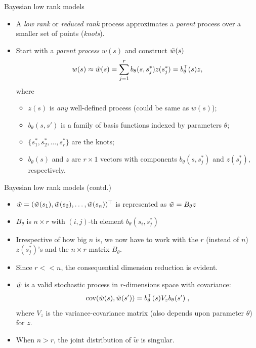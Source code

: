 \begin{frame}{Bayesian low rank models}

\begin{itemize}\setlength{\itemsep}{0.4cm}
\item A \emph{low rank} or \emph{reduced rank} process approximates a \emph{parent} process over a smaller set of points (\emph{knots}).

\item Start with a \emph{parent process} $w(s)$ and construct $\tilde{w}(s)$
\begin{equation*}\label{eq:generic_low_rank}
w(s) \approx \tilde{w}(s) = \sum_{j=1}^{r} b_{\theta}(s,s_{j}^{*}) z(s_{j}^{*}) = b_{\theta}^{\top}(s)z,
\end{equation*}
where 
\begin{itemize}\setlength{\itemsep}{0.25cm}
 \item $z(s)$ is \emph{any} well-defined process (could be same as $w(s)$);
 \item $b_{\theta}(s,s')$ is a family of basis functions indexed by parameters $\theta$;
 \item $\{s_1^*,s^*_2,\ldots,s^*_r\}$ are the knots;
 \item $b_{\theta}(s)$ and $z$ are $r\times 1$ vectors with components $b_{\theta}(s,s_{j}^{*})$ and $z(s_j^*)$, respectively.
\end{itemize}

\end{itemize}

\end{frame}


\begin{frame}{Bayesian low rank models (contd.)}

\begin{itemize}\setlength{\itemsep}{0.cm}
\item $\tilde{w} = (\tilde{w}(s_1), \tilde{w}(s_2),\ldots,\tilde{w}(s_{n}))^{\top}$ is represented as $\tilde{w} = B_{\theta}z$
\item $B_{\theta}$ is $n\times r$ with $(i,j)$-th element $b_{\theta}(s_i,s_{j}^{*})$
\item Irrespective of how big $n$ is, we now have to work with the $r$ (instead of $n$) $z(s_j^*)$'s and the  $n\times r$ matrix $B_{\theta}$. 
\item Since $r << n$, the consequential dimension reduction is evident.
\item $\tilde{w}$ is a valid stochastic process in $r$-dimensions space with covariance:
\[
 \mbox{cov}(\tilde{w}(s), \tilde{w}(s')) = b_{\theta}^{\top}(s)V_{z}b_{\theta}(s')\;,
\]
where $V_z$ is the variance-covariance matrix (also depends upon parameter $\theta$) for $z$.
\item When $n > r$, the joint distribution of ${\tilde{w}}$ is singular.
\end{itemize}

\end{frame}

